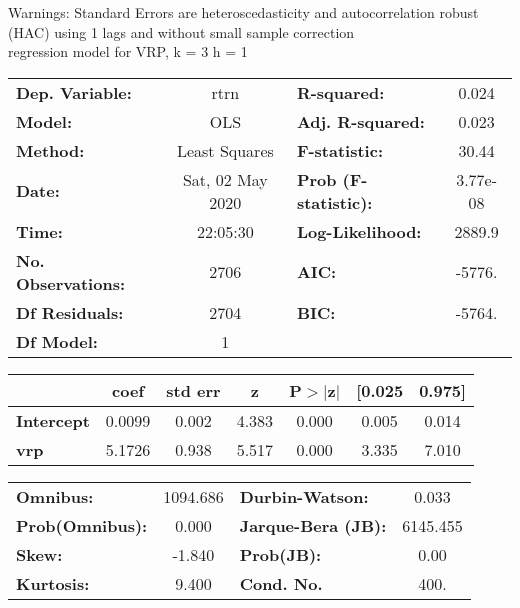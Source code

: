 Warnings: \newline
 [1] Standard Errors are heteroscedasticity and autocorrelation robust (HAC) using 1 lags and without small sample correction\\ 

regression model for VRP, k = 3 h = 1\begin{center}
\begin{tabular}{lclc}
\toprule
\textbf{Dep. Variable:}    &       rtrn       & \textbf{  R-squared:         } &     0.024   \\
\textbf{Model:}            &       OLS        & \textbf{  Adj. R-squared:    } &     0.023   \\
\textbf{Method:}           &  Least Squares   & \textbf{  F-statistic:       } &     30.44   \\
\textbf{Date:}             & Sat, 02 May 2020 & \textbf{  Prob (F-statistic):} &  3.77e-08   \\
\textbf{Time:}             &     22:05:30     & \textbf{  Log-Likelihood:    } &    2889.9   \\
\textbf{No. Observations:} &        2706      & \textbf{  AIC:               } &    -5776.   \\
\textbf{Df Residuals:}     &        2704      & \textbf{  BIC:               } &    -5764.   \\
\textbf{Df Model:}         &           1      & \textbf{                     } &             \\
\bottomrule
\end{tabular}
\begin{tabular}{lcccccc}
                   & \textbf{coef} & \textbf{std err} & \textbf{z} & \textbf{P$> |$z$|$} & \textbf{[0.025} & \textbf{0.975]}  \\
\midrule
\textbf{Intercept} &       0.0099  &        0.002     &     4.383  &         0.000        &        0.005    &        0.014     \\
\textbf{vrp}       &       5.1726  &        0.938     &     5.517  &         0.000        &        3.335    &        7.010     \\
\bottomrule
\end{tabular}
\begin{tabular}{lclc}
\textbf{Omnibus:}       & 1094.686 & \textbf{  Durbin-Watson:     } &    0.033  \\
\textbf{Prob(Omnibus):} &   0.000  & \textbf{  Jarque-Bera (JB):  } & 6145.455  \\
\textbf{Skew:}          &  -1.840  & \textbf{  Prob(JB):          } &     0.00  \\
\textbf{Kurtosis:}      &   9.400  & \textbf{  Cond. No.          } &     400.  \\
\bottomrule
\end{tabular}
\end{center}

